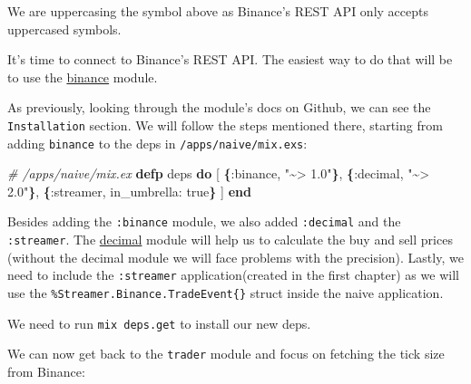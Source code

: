 \documentclass[
  oneside]{book}
\newenvironment{Shaded}{\begin{snugshade}}{\end{snugshade}}
\newcommand{\CommentTok}[1]{\textcolor[rgb]{0.56,0.35,0.01}{\textit{#1}}}
\newcommand{\ConstantTok}[1]{\textcolor[rgb]{0.56,0.35,0.01}{#1}}
\newcommand{\FunctionTok}[1]{\textcolor[rgb]{0.13,0.29,0.53}{\textbf{#1}}}
\newcommand{\KeywordTok}[1]{\textcolor[rgb]{0.13,0.29,0.53}{\textbf{#1}}}
\newcommand{\NormalTok}[1]{#1}
\newcommand{\OtherTok}[1]{\textcolor[rgb]{0.56,0.35,0.01}{#1}}
\newcommand{\StringTok}[1]{\textcolor[rgb]{0.31,0.60,0.02}{#1}}
\newcommand{\VariableTok}[1]{\textcolor[rgb]{0.00,0.00,0.00}{#1}}
\begin{document}
We are uppercasing the symbol above as Binance's REST API only accepts uppercased symbols.

It's time to connect to Binance's REST API. The easiest way to do that will be to use the \href{https://github.com/dvcrn/binance.ex}{binance} module.

As previously, looking through the module's docs on Github, we can see the \texttt{Installation} section. We will follow the steps mentioned there, starting from adding \texttt{binance} to the deps in \texttt{/apps/naive/mix.exs}:

\begin{Shaded}
\begin{Highlighting}[]
  \CommentTok{\# /apps/naive/mix.ex}
  \KeywordTok{defp}\NormalTok{ deps }\KeywordTok{do}
    \OtherTok{[}
      \FunctionTok{\{}\VariableTok{:binance}\NormalTok{, }\StringTok{"\textasciitilde{}\textgreater{} 1.0"}\FunctionTok{\}}\NormalTok{,}
      \FunctionTok{\{}\VariableTok{:decimal}\NormalTok{, }\StringTok{"\textasciitilde{}\textgreater{} 2.0"}\FunctionTok{\}}\NormalTok{,}
      \FunctionTok{\{}\VariableTok{:streamer}\NormalTok{, }\VariableTok{in\_umbrella:} \ConstantTok{true}\FunctionTok{\}}
    \OtherTok{]}
  \KeywordTok{end}
\end{Highlighting}
\end{Shaded}

Besides adding the \texttt{:binance} module, we also added \texttt{:decimal} and the \texttt{:streamer}. The \href{https://github.com/ericmj/decimal}{decimal} module will help us to calculate the buy and sell prices (without the decimal module we will face problems with the precision). Lastly, we need to include the \texttt{:streamer} application(created in the first chapter) as we will use the \texttt{\%Streamer.Binance.TradeEvent\{\}} struct inside the naive application.

We need to run \texttt{mix\ deps.get} to install our new deps.

We can now get back to the \texttt{trader} module and focus on fetching the tick size from Binance:
\end{document}
